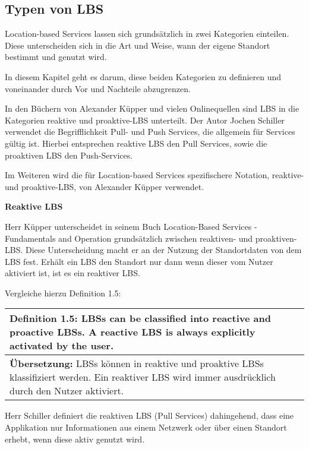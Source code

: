 \newpage
\subsection{Typen von LBS}

Location-based Services lassen sich grundsätzlich in zwei Kategorien einteilen. Diese unterscheiden sich in die Art und Weise, wann der eigene Standort bestimmt und genutzt wird. 

In diesem Kapitel geht es darum, diese beiden Kategorien zu definieren und voneinander durch Vor und Nachteile abzugrenzen.

In den Büchern von Alexander Küpper und vielen Onlinequellen sind LBS in die Kategorien reaktive und proaktive-LBS unterteilt. Der Autor Jochen Schiller verwendet die Begrifflichkeit Pull- und Push Services, die allgemein für Services gültig ist.
Hierbei entsprechen reaktive LBS den Pull Services, sowie die proaktiven LBS den Push-Services. 

Im Weiteren wird die für Location-based Services spezifischere Notation, reaktive- und proaktive-LBS, von Alexander Küpper verwendet.


\textbf{Reaktive LBS}

Herr Küpper unterscheidet in seinem Buch \glqq Location-Based Services - Fundamentals and Operation \grqq grundsätzlich zwischen reaktiven- und proaktiven-LBS. Diese Unterscheidung macht er an der Nutzung der Standortdaten von dem LBS fest. Erhält ein LBS den Standort nur dann wenn dieser vom Nutzer aktiviert ist, ist es ein reaktiver LBS.

Vergleiche hierzu Definition 1.5:

\begin{table}[h]
	\centering
	\begin{tabular}{|p{16cm}|}\hline
		\textbf{Definition 1.5:} \glqq LBSs can be classified into reactive and proactive LBSs. A reactive LBS is always explicitly activated by the user. \grqq \cite[S.3]{Kuepper2005} \\ \hline
		\textbf{Übersetzung:} LBSs können in reaktive und proaktive LBSs klassifiziert werden. Ein reaktiver LBS wird immer ausdrücklich durch den Nutzer aktiviert.\\ \hline
	\end{tabular}
\end{table}


Herr Schiller definiert die reaktiven LBS (Pull Services) dahingehend, dass eine Applikation nur Informationen aus einem Netzwerk oder über einen Standort erhebt, wenn diese aktiv genutzt wird.

